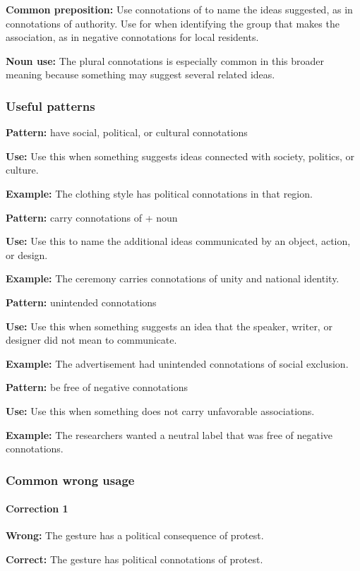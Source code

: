 \documentclass[11pt]{article}
\begin{document}
\textbf{Common preposition:} Use connotations of to name the ideas suggested, as in connotations of authority. Use for when identifying the group that makes the association, as in negative connotations for local residents.

\textbf{Noun use:} The plural connotations is especially common in this broader meaning because something may suggest several related ideas.

\subsubsection{Useful patterns}
\textbf{Pattern:} have social, political, or cultural connotations

\textbf{Use:} Use this when something suggests ideas connected with society, politics, or culture.

\textbf{Example:} The clothing style has political connotations in that region.

\textbf{Pattern:} carry connotations of + noun

\textbf{Use:} Use this to name the additional ideas communicated by an object, action, or design.

\textbf{Example:} The ceremony carries connotations of unity and national identity.

\textbf{Pattern:} unintended connotations

\textbf{Use:} Use this when something suggests an idea that the speaker, writer, or designer did not mean to communicate.

\textbf{Example:} The advertisement had unintended connotations of social exclusion.

\textbf{Pattern:} be free of negative connotations

\textbf{Use:} Use this when something does not carry unfavorable associations.

\textbf{Example:} The researchers wanted a neutral label that was free of negative connotations.

\subsubsection{Common wrong usage}
\paragraph{Correction 1}
\textbf{Wrong:} The gesture has a political consequence of protest.

\textbf{Correct:} The gesture has political connotations of protest.
\end{document}

